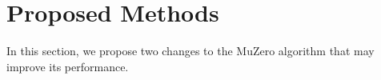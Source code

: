 \section{Proposed Methods}
In this section, we propose two changes to the MuZero algorithm that may improve its performance.


